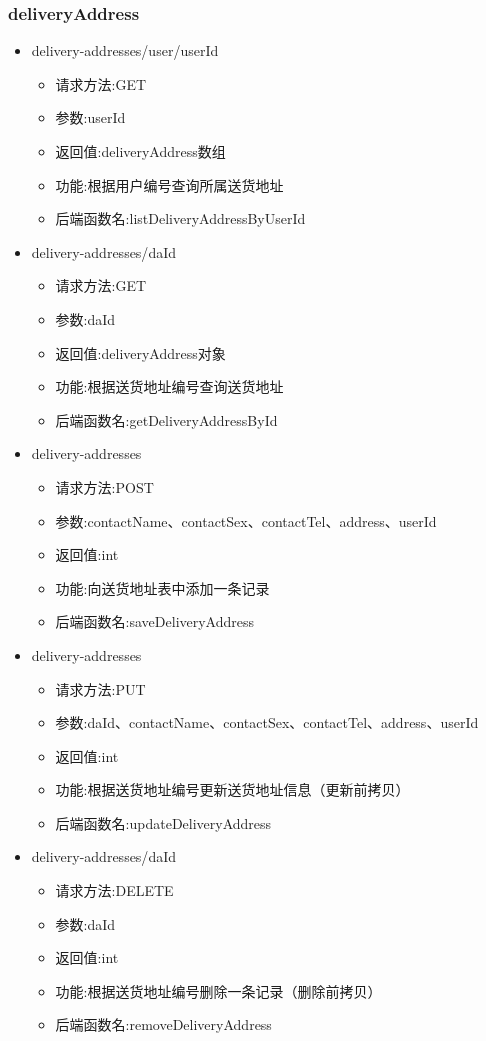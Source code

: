 \subsubsection*{deliveryAddress}
\begin{itemize}
\item delivery-addresses/user/{userId}
\begin{itemize}
    \item 请求方法:GET
    \item 参数:userId
    \item 返回值:deliveryAddress数组
    \item 功能:根据用户编号查询所属送货地址
    \item 后端函数名:listDeliveryAddressByUserId
\end{itemize}

\item delivery-addresses/{daId}
\begin{itemize}
    \item 请求方法:GET
    \item 参数:daId
    \item 返回值:deliveryAddress对象
    \item 功能:根据送货地址编号查询送货地址
    \item 后端函数名:getDeliveryAddressById
\end{itemize}

\item delivery-addresses
\begin{itemize}
    \item 请求方法:POST
    \item 参数:contactName、contactSex、contactTel、address、userId
    \item 返回值:int
    \item 功能:向送货地址表中添加一条记录
    \item 后端函数名:saveDeliveryAddress
\end{itemize}

\item delivery-addresses
\begin{itemize}
    \item 请求方法:PUT
    \item 参数:daId、contactName、contactSex、contactTel、address、userId
    \item 返回值:int
    \item 功能:根据送货地址编号更新送货地址信息（更新前拷贝）
    \item 后端函数名:updateDeliveryAddress
\end{itemize}

\item delivery-addresses/{daId}
\begin{itemize}
    \item 请求方法:DELETE
    \item 参数:daId
    \item 返回值:int
    \item 功能:根据送货地址编号删除一条记录（删除前拷贝）
    \item 后端函数名:removeDeliveryAddress
\end{itemize}
\end{itemize}

